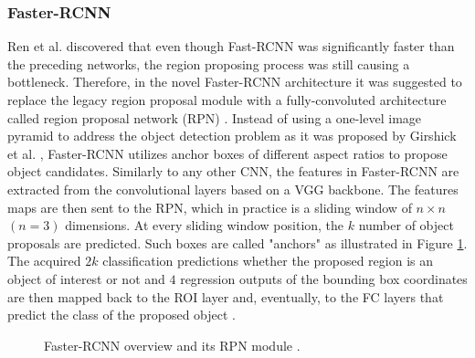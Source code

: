 \subsubsection{Faster-RCNN} 
Ren et al. \cite{ima} discovered that even though Fast-RCNN was significantly faster than the preceding networks, the region proposing process was still causing a bottleneck. Therefore, in the novel Faster-RCNN \cite{ima} architecture it was suggested to replace the legacy region proposal module with a fully-convoluted architecture called region proposal network (RPN) \cite{Girshick2013}. Instead of using a one-level image pyramid to address the object detection problem as it was proposed by Girshick et al. \cite{Girshick2015}, Faster-RCNN utilizes anchor boxes of different aspect ratios to propose object candidates. Similarly to any other CNN, the features in Faster-RCNN are extracted from the convolutional layers based on a VGG backbone. The features maps are then sent to the RPN, which in practice is a sliding window  of $n\times n$ $(n=3)$ dimensions. At every sliding window position, the $k$ number of object proposals are predicted. Such boxes are called "anchors" as illustrated in Figure \ref{fig:faster_rcnn}. The acquired $2k$ classification predictions whether the proposed region is an object of interest or not and $4$ regression outputs of the bounding box coordinates are then mapped back to the ROI layer and, eventually, to the FC layers that predict the class of the proposed object \cite{ima}. 


\begin{figure}[htb]
    \centering
    \qquad
    \caption{Faster-RCNN overview and its RPN module \cite{ima}.}
    \label{fig:faster_rcnn}%
\end{figure}

